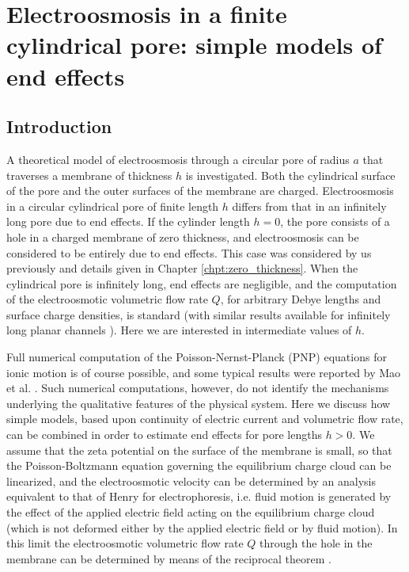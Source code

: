 \chapter{Electroosmosis in a finite cylindrical pore: simple models of end effects}\label{chpt:finite_thickness}
\newcommand*\mycommand[1]{\texttt{\emph{#1}}}
\section{Introduction}
A theoretical model of electroosmosis through a circular pore of radius $a$ that traverses a membrane of thickness $h$ is investigated. Both the cylindrical surface of the pore and the outer surfaces of the membrane are charged. Electroosmosis in a circular cylindrical pore of finite length $h$ differs from that in an infinitely long pore due to end effects. If the cylinder length $h=0$, the pore consists of a hole in a charged membrane of zero thickness, and electroosmosis can be considered to be entirely due to end effects. This case was considered by us previously \cite{mao2014} and details given in Chapter \ref{chpt:zero_thickness}. When the cylindrical pore is infinitely long, end effects are negligible, and the computation of the electroosmotic volumetric flow rate $Q$, for arbitrary Debye lengths and surface charge densities, is standard \cite{rice1965,gross1968}
(with similar results available for infinitely long planar channels \cite{baldessari2008a,baldessari2008b}). Here we are interested in intermediate values of $h$. 

Full numerical computation of the Poisson-Nernst-Planck (PNP) equations for ionic motion is of course possible, and some typical results were reported by Mao et al. \cite{mao2014}. Such numerical computations, however, do not identify the mechanisms underlying the qualitative features of the physical system. Here we discuss how simple models, based upon continuity of electric current and volumetric flow rate, can be combined in order to estimate end effects for pore lengths $h>0$. We assume that the zeta potential on the surface of the membrane is small, so that the Poisson-Boltzmann equation governing the equilibrium charge cloud can be linearized, and the electroosmotic velocity can be determined by an analysis equivalent to that of Henry \cite{Henry_1931} for electrophoresis, i.e. fluid motion is generated by the effect of the applied electric field acting on the equilibrium charge cloud (which is not deformed either by the applied electric field or by fluid motion). In this limit the electroosmotic volumetric flow rate $Q$ through the hole in
the membrane can be determined by means of the reciprocal theorem \cite{mao2014}.

